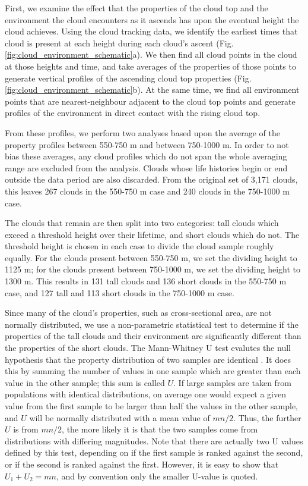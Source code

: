 \documentclass[acp]{copernicus}
\begin{document}
First, we examine the effect that the properties of the cloud top and the 
environment the cloud encounters as it ascends has upon the eventual height the 
cloud achieves.  Using the cloud tracking data, we identify the earliest times 
that cloud is present at each height during each cloud's ascent 
(Fig. \ref{fig:cloud_environment_schematic}a).  We then find all cloud points 
in the cloud at those heights and time, and take averages of the properties of 
those points to generate vertical profiles of the ascending cloud top 
properties (Fig. \ref{fig:cloud_environment_schematic}b).  At the same time, 
we find all environment points that are nearest-neighbour adjacent to the cloud 
top points and generate profiles of the environment in direct contact with the 
rising cloud top.

From these profiles, we perform two analyses based upon the average of the 
property profiles between 550-750 m and between 750-1000 m.  In order to not 
bias these averages, any cloud profiles which do not span the whole averaging 
range are excluded from the analysis.  Clouds whose life histories begin or end 
outside the data period are also discarded.  From the original set of 3,171 
clouds, this leaves 267 clouds in the 550-750 m case and 240 clouds in the 
750-1000 m case.

The clouds that remain are then split into two categories: tall clouds which 
exceed a threshold height over their lifetime, and short clouds which do not.  
The threshold height is chosen in each case to divide the cloud sample roughly 
equally.  For the clouds present between 550-750 m, we set the dividing 
height to 1125 m; for the clouds present between 750-1000 m, we set the 
dividing height to 1300 m.  This results in 131 tall clouds and 136 short 
clouds in the 550-750 m case, and 127 tall and 113 short clouds in the 
750-1000 m case.

Since many of the cloud's properties, such as cross-sectional area, are not 
normally distributed, we use a non-parametric statistical test to determine if 
the properties of the tall clouds and their environment are significantly 
different than the properties of the short clouds.  The Mann-Whitney U test 
evalutes the null hypothesis that the property distribution of two samples are 
identical \citep{Mann1947}.  It does this by summing the number of values 
in one sample which are greater than each value in the other sample; this sum 
is called $U$.  If large samples are taken from populations with identical 
distributions, on average one would expect a given value from the first sample 
to be larger than half the values in the other sample, and $U$ will be normally 
distributed with a mean value of $mn/2$.  Thus, the further $U$ is from $mn/2$, 
the more likely it is that the two samples come from distributions with 
differing magnitudes.  Note that there are actually two U values defined by 
this test, depending on if the first sample is ranked against the second, or 
if the second is ranked against the first.  However, it is easy to show that 
$U_1 + U_2 = mn$, and by convention only the smaller U-value is quoted.
\end{document}
